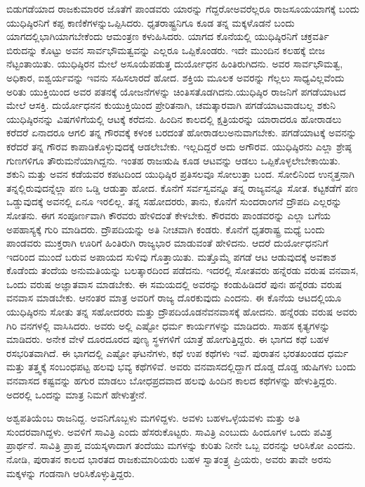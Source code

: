 ಬಿಡುಗಡೆಯಾದ ರಾಜಕುಮಾರರ ಜೊತೆಗೆ ಪಾಂಡವರು ಯಾರನ್ನು ಗೆದ್ದರೋ\break ಅವರೆಲ್ಲರೂ ರಾಜಸೂಯಯಾಗಕ್ಕೆ ಬಂದು ಯುಧಿಷ್ಠಿರನಿಗೆ ಕಪ್ಪ ಕಾಣಿಕೆಗಳನ್ನು\break ಒಪ್ಪಿಸಿದರು. ಧೃತರಾಷ್ಟ್ರನಿಗೂ ಕೂಡ ತನ್ನ ಮಕ್ಕಳೊಡನೆ ಬಂದು ಯಾಗದಲ್ಲಿ\break ಭಾಗಿಯಾಗಬೇಕೆಂದು ಆಮಂತ್ರಣ ಕಳುಹಿಸಿದರು. ಯಾಗದ ಕೊನೆಯಲ್ಲಿ ಯುಧಿಷ್ಠಿರನಿಗೆ ಚಕ್ರವರ್ತಿ ಬಿರುದನ್ನು ಕೊಟ್ಟು ಅವನ ಸಾರ್ವಭೌಮತ್ವವನ್ನು ಎಲ್ಲರೂ ಒಪ್ಪಿಕೊಂಡರು. ಇದೇ ಮುಂದಿನ ಕಲಹಕ್ಕೆ ಬೀಜ ನೆಟ್ಟಂತಾಯಿತು. ಯುಧಿಷ್ಠಿರನ ಮೇಲೆ ಅಸೂಯೆಪಡುತ್ತ ದುರ್ಯೋಧನ ಹಿಂತಿರುಗಿದನು. ಅವರ ಸಾರ್ವಭೌಮತ್ವ, ಅಧಿಕಾರ, ಐಶ್ವರ್ಯವನ್ನು ಇವನು ಸಹಿಸಲಾರದೆ ಹೋದ. ಶಕ್ತಿಯ ಮೂಲಕ ಅವರನ್ನು ಗೆಲ್ಲಲು ಸಾಧ್ಯವಿಲ್ಲವೆಂದು ಅರಿತು ಯುಕ್ತಿಯಿಂದ ಅವರ ಪತನಕ್ಕೆ ಯೋಜನೆಗಳನ್ನು ಚಿಂತಿಸತೊಡಗಿದನು.\break ಯುಧಿಷ್ಠಿರ ರಾಜನಿಗೆ ಪಗಡೆಯಾಟದ ಮೇಲೆ ಆಸಕ್ತಿ. ದುರ್ಯೋಧನನ ಕುಯುಕ್ತಿಯಿಂದ ಪ್ರೇರಿತನಾಗಿ, ಚಮತ್ಕಾರವಾಗಿ ಪಗಡೆಯಾಟವಾಡಬಲ್ಲ ಶಕುನಿ ಯುಧಿಷ್ಠಿರನನ್ನು ವಿಷಗಳಿಗೆಯಲ್ಲಿ ಆಟಕ್ಕೆ ಕರೆದನು. ಹಿಂದಿನ ಕಾಲದಲ್ಲಿ ಕ್ಷತ್ರಿಯರನ್ನು ಯಾರಾದರೂ ಹೋರಾಡಲು ಕರೆದರೆ ಏನಾದರೂ ಆಗಲಿ ತನ್ನ ಗೌರವಕ್ಕೆ ಕಳಂಕ ಬರದಂತೆ ಹೋರಾಡಲು\break ಅನುವಾಗಬೇಕು. ಪಗಡೆಯಾಟಕ್ಕೆ ಅವನನ್ನು ಕರೆದರೆ ತನ್ನ ಗೌರವ ಕಾಪಾಡಿಕೊಳ್ಳುವುದಕ್ಕೆ ಆಡಲೇಬೇಕು. ಇಲ್ಲದಿದ್ದರೆ ಅದು ಅಗೌರವ. ಯುಧಿಷ್ಠಿರನು ಎಲ್ಲಾ ಶ್ರೇಷ್ಠ ಗುಣಗಳಿಗೂ ತೌರುಮನೆಯಾಗಿದ್ದನು. ಇಂತಹ ರಾಜಋಷಿ ಕೂಡ ಆಟವನ್ನು ಆಡಲು ಒಪ್ಪಿಕೊಳ್ಳಲೇಬೇಕಾಯಿತು. ಶಕುನಿ ಮತ್ತು ಅವನ ಕಡೆಯವರ ಕಪಟದಿಂದ ಯುಧಿಷ್ಠಿರ ಪ್ರತಿಸಲವೂ ಸೋಲುತ್ತಾ ಬಂದ. ಸೋಲಿನಿಂದ ಉನ್ಮತ್ತನಾಗಿ ತನ್ನಲ್ಲಿರುವುದನ್ನೆಲ್ಲಾ ಪಣ ಒಡ್ಡಿ ಆಡುತ್ತಾ ಹೋದ. ಕೊನೆಗೆ ಸರ್ವಸ್ವವನ್ನೂ ತನ್ನ ರಾಜ್ಯವನ್ನೂ ಸೋತ. ಕಟ್ಟಕಡೆಗೆ ಪಣ ಒಡ್ಡುವುದಕ್ಕೆ ಅವನಲ್ಲಿ ಏನೂ ಇರಲಿಲ್ಲ. ತನ್ನ ಸಹೋದರರು, ತಾನು, ಕೊನೆಗೆ ಸುಂದರಾಂಗನೆ ದ್ರೌಪದಿ ಎಲ್ಲರನ್ನು ಸೋತನು. ಈಗ ಸಂಪೂರ್ಣವಾಗಿ ಕೌರವರು ಹೇಳಿದಂತೆ ಕೇಳಬೇಕು. ಕೌರವರು ಪಾಂಡವರನ್ನು ಎಲ್ಲಾ ಬಗೆಯ ಅಪಹಾಸ್ಯಕ್ಕೆ ಗುರಿ ಮಾಡಿದರು. ದ್ರೌಪದಿಯನ್ನು ಅತಿ ನೀಚವಾಗಿ ಕಂಡರು. ಕೊನೆಗೆ ಧೃತರಾಷ್ಟ್ರ ಮಧ್ಯೆ ಬಂದು ಪಾಂಡವರು ಮುಕ್ತರಾಗಿ ಊರಿಗೆ ಹಿಂತಿರುಗಿ ರಾಜ್ಯಭಾರ ಮಾಡುವಂತೆ ಹೇಳಿದನು. ಆದರೆ ದುರ್ಯೋಧನನಿಗೆ ಇದರಿಂದ ಮುಂದೆ ಬರುವ ಅಪಾಯದ ಸುಳಿವು ಗೊತ್ತಾಯಿತು. ಮತ್ತೊಮ್ಮೆ ಪಗಡೆ ಆಟ ಆಡುವುದಕ್ಕೆ ಅವಕಾಶ ಕೊಡೆಂದು ತಂದೆಯ ಅನುಮತಿಯನ್ನು ಬಲತ್ಕಾರದಿಂದ ಪಡೆದನು. ಇದರಲ್ಲಿ ಸೋತವರು ಹನ್ನೆರಡು ವರುಷ ವನವಾಸ, ಒಂದು ವರುಷ ಅಜ್ಞಾತವಾಸ ಮಾಡಬೇಕು. ಈ ಸಮಯದಲ್ಲಿ ಅವರನ್ನು ಕಂಡುಹಿಡಿದರೆ ಪುನಃ ಹನ್ನೆರಡು ವರುಷ ವನವಾಸ ಮಾಡಬೇಕು. ಆನಂತರ ಮಾತ್ರ ಅವರಿಗೆ ರಾಜ್ಯ ದೊರಕುವುದು ಎಂದನು. ಈ ಕೊನೆಯ ಆಟದಲ್ಲಿಯೂ ಯುಧಿಷ್ಠಿರನು ಸೋತು ತನ್ನ ಸಹೋದರರು ಮತ್ತು ದ್ರೌಪದಿಯೊಡನೆ\break ವನವಾಸಕ್ಕೆ ಹೋದನು. ಹನ್ನೆರಡು ವರುಷ ಅವರು ಗಿರಿ ವನಗಳಲ್ಲಿ ವಾಸಿಸಿದರು. ಅವರು ಅಲ್ಲಿ ಎಷ್ಟೋ ಧರ್ಮ ಕಾರ್ಯಗಳನ್ನು ಮಾಡಿದರು. ಸಾಹಸ ಕೃತ್ಯಗಳನ್ನು ಮಾಡಿದರು. ಅನೇಕ ವೇಳೆ ದೂರದೂರದ ಪುಣ್ಯ ಸ್ಥಳಗಳಿಗೆ ಯಾತ್ರೆ ಹೋಗುತ್ತಿದ್ದರು. ಈ ಭಾಗದ ಕಥೆ ಬಹಳ ರಸಭರಿತವಾಗಿದೆ. ಈ ಭಾಗದಲ್ಲಿ ಎಷ್ಟೋ ಘಟನೆಗಳು, ಕಥೆ ಉಪ ಕಥೆಗಳು ಇವೆ. ಪುರಾತನ ಭರತಖಂಡದ ಧರ್ಮ ಮತ್ತು ತತ್ತ್ವಕ್ಕೆ ಸಂಬಂಧಪಟ್ಟ ಹಲವು ಭವ್ಯ ಕಥೆಗಳಿವೆ. ಅವರು ವನವಾಸದಲ್ಲಿದ್ದಾಗ ದೊಡ್ಡ ದೊಡ್ಡ ಋಷಿಗಳು ಬಂದು ವನವಾಸದ ಕಷ್ಟವನ್ನು ಹಗುರ ಮಾಡಲು ಬೋಧಪ್ರದವಾದ ಹಲವು ಹಿಂದಿನ ಕಾಲದ ಕಥೆಗಳನ್ನು ಹೇಳುತ್ತಿದ್ದರು. ಅದರಲ್ಲಿ ಒಂದನ್ನು ಮಾತ್ರ ನಿಮಗೆ ಹೇಳುತ್ತೇನೆ.

\vskip 0.1cm

ಅಶ್ವಪತಿಯೆಂಬ ರಾಜನಿದ್ದ. ಅವನಿಗೊಬ್ಬಳು ಮಗಳಿದ್ದಳು. ಅವಳು ಬಹಳ\break ಒಳ್ಳೆಯವಳು ಮತ್ತು ಅತಿ ಸುಂದರವಾಗಿದ್ದಳು. ಅವಳಿಗೆ ಸಾವಿತ್ರಿ ಎಂದು ಹೆಸರು\break ಕೊಟ್ಟರು. ಸಾವಿತ್ರಿ ಎಂಬುದು ಹಿಂದೂಗಳ ಒಂದು ಪವಿತ್ರ ಪ್ರಾರ್ಥನೆ. ಸಾವಿತ್ರಿ ಪ್ರಾಪ್ತ ವಯಸ್ಕಳಾದಾಗ ತಂದೆಯು ಮಗಳನ್ನು ಕುರಿತು ನೀನೇ ಒಬ್ಬ ವರನನ್ನು ಆರಿಸಿಕೋ ಎಂದನು. ನೋಡಿ, ಪುರಾತನ ಕಾಲದ ಭಾರತದ ರಾಜಕುಮಾರಿಯರು ಬಹಳ ಸ್ವಾತಂತ್ರ್ಯ ಪ್ರಿಯರು, ಅವರು ತಾವೇ ಅರಸು ಮಕ್ಕಳನ್ನು ಗಂಡನಾಗಿ ಆರಿಸಿಕೊಳ್ಳುತ್ತಿದ್ದರು.

